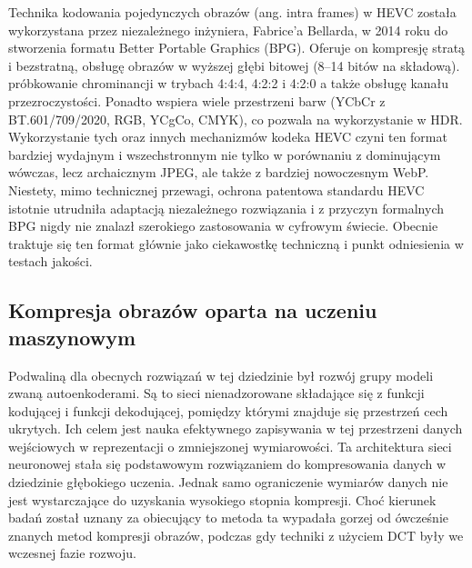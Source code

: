 Technika kodowania pojedynczych obrazów (ang. intra frames) w HEVC została wykorzystana przez niezależnego inżyniera, Fabrice'a Bellarda, w 2014 roku do stworzenia formatu Better Portable Graphics (BPG). Oferuje on kompresję stratą i bezstratną, obsługę obrazów w wyższej głębi bitowej (8--14 bitów na składową). próbkowanie chrominancji w trybach 4:4:4, 4:2:2 i 4:2:0 a także obsługę kanału przezroczystości. Ponadto wspiera wiele przestrzeni barw (YCbCr z BT.601/709/2020, RGB, YCgCo, CMYK), co pozwala na wykorzystanie w HDR. Wykorzystanie tych oraz innych mechanizmów kodeka HEVC czyni ten format bardziej wydajnym i wszechstronnym nie tylko w porównaniu z dominującym wówczas, lecz archaicznym JPEG, ale także z bardziej nowoczesnym WebP. Niestety, mimo technicznej przewagi, ochrona patentowa standardu HEVC istotnie utrudniła adaptacją niezależnego rozwiązania i z przyczyn formalnych BPG nigdy nie znalazł szerokiego zastosowania w cyfrowym świecie. Obecnie traktuje się ten format głównie jako ciekawostkę techniczną i punkt odniesienia w testach jakości.

\subsection{Kompresja obrazów oparta na uczeniu maszynowym}
Podwaliną dla obecnych rozwiązań w tej dziedzinie był rozwój grupy modeli zwaną autoenkoderami. Są to sieci nienadzorowane składające się z funkcji kodującej i funkcji dekodującej, pomiędzy którymi znajduje się przestrzeń cech ukrytych. Ich celem jest nauka efektywnego zapisywania w tej przestrzeni danych wejściowych w reprezentacji o zmniejszonej wymiarowości. Ta architektura sieci neuronowej stała się podstawowym rozwiązaniem do kompresowania danych w dziedzinie głębokiego uczenia. Jednak samo ograniczenie wymiarów danych nie jest wystarczające do uzyskania wysokiego stopnia kompresji. Choć kierunek badań został uznany za obiecujący to metoda ta wypadała gorzej od ówcześnie znanych metod kompresji obrazów\cite{earlyaecompression}, podczas gdy techniki z użyciem DCT były we wczesnej fazie rozwoju.

